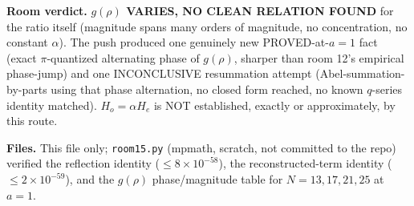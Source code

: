 \textbf{Room verdict.} \textbf{$g(\rho)$ VARIES, NO CLEAN RELATION FOUND} for the ratio itself
(magnitude spans many orders of magnitude, no concentration, no constant $\alpha$). The push
produced one genuinely new PROVED-at-$a{=}1$ fact (exact $\pi$-quantized alternating phase of
$g(\rho)$, sharper than room 12's empirical phase-jump) and one INCONCLUSIVE resummation attempt
(Abel-summation-by-parts using that phase alternation, no closed form reached, no known $q$-series
identity matched). $H_o=\alpha H_e$ is NOT established, exactly or approximately, by this route.

\textbf{Files.} This file only; \texttt{room15.py} (mpmath, scratch, not committed to the repo)
verified the reflection identity ($\le8\times10^{-58}$), the reconstructed-term identity
($\le2\times10^{-59}$), and the $g(\rho)$ phase/magnitude table for $N=13,17,21,25$ at $a=1$.
